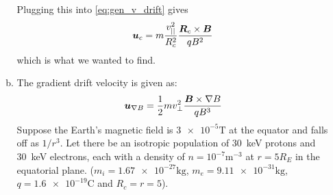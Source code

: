 \begin{enumerate}
\begin{enumerate}[(a)]
        Plugging this into \cref{eq:gen_v_drift} gives
        \begin{equation*}
            \boldsymbol{u}_c=m\frac{v_{||}^2}{R_c^2}\frac{\boldsymbol{R}_c\times\boldsymbol{B}}{qB^2}
        \end{equation*}
        which is what we wanted to find.
        \item The gradient drift velocity is given as:
        \begin{equation*}
            \boldsymbol{u}_{\nabla B}=\frac{1}{2}mv_\perp^2\frac{\boldsymbol{B}\times\nabla B}{qB^3}
        \end{equation*}
        Suppose the Earth's magnetic field is \(\num{3e-5}\si{\tesla}\) at the equator and falls off as \(1/r^3\). Let there be an isotropic population of \SI{30}{\kilo\electronvolt} protons and \SI{30}{\kilo\electronvolt} electrons, each with a density of \(n=10^{-7}\si{\metre^{-3}}\) at \(r=5R_E\) in the equatorial plane. (\(m_i=\num{1.67e-27}\si{\kilo\gram}\), \(m_e=\num{9.11e-31}\si{\kilo\gram}\), \(q=\num{1.6e-19}\si{\coulomb}\) and \(R_c=r=5\)).


\end{enumerate}
\end{enumerate}
